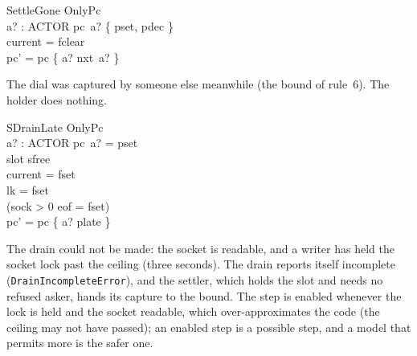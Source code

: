 \documentclass[a4paper,10pt,fleqn]{article}
\begin{document}
\begin{schema}{SettleGone}
  OnlyPc \\
  a? : ACTOR
\where
  pc~a? \in \{ pset, pdec \} \\
  current = fclear \\
  pc' = pc \oplus \{ a? \mapsto nxt~a? \}
\end{schema}

The dial was captured by someone else meanwhile (the bound of rule~6).  The
holder does nothing.

\begin{schema}{SDrainLate}
  OnlyPc \\
  a? : ACTOR
\where
  pc~a? = pset \\
  slot \neq sfree \\
  current = fset \\
  lk = fset \\
  (sock > 0 \lor eof = fset) \\
  pc' = pc \oplus \{ a? \mapsto plate \}
\end{schema}

The drain could not be made: the socket is readable, and a writer has held the
socket lock past the ceiling (three seconds).  The drain reports itself
incomplete (\texttt{DrainIncompleteError}), and the settler, which holds the slot
and needs no refused asker, hands its capture to the bound.  The step is enabled
whenever the lock is held and the socket readable, which over-approximates the
code (the ceiling may not have passed); an enabled step is a possible step, and
a model that permits more is the safer one.
\end{document}
